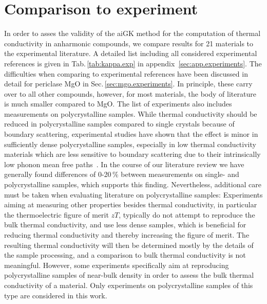 \section{Comparison to experiment}
\label{sec:results.experiments}
In order to asses the validity of the aiGK method for the computation of thermal conductivity in anharmonic compounds, we compare results for 21 materials to the experimental literature. A detailed list including all considered experimental references is given in Tab.\,\ref{tab:kappa.exp} in appendix~\ref{sec:app.experiments}. The difficulties when comparing to experimental references have been discussed in detail for periclase MgO in Sec.\,\ref{sec:mgo.experiments}. In principle, these carry over to all other compounds, however, for most materials, the body of literature is much smaller compared to MgO. The list of experiments also includes measurements on polycrystalline samples. While thermal conductivity should be reduced in polycrystalline samples compared to single crystals because of boundary scattering, experimental studies have shown that the effect is minor in sufficiently dense polycrystalline samples, especially in low thermal conductivity materials which are less sensitive to boundary scattering due to their intrinsically low phonon mean free paths~\cite{Charvat.1957}. In the course of our literature review we have generally found differences of 0-20\,\% between measurements on single- and polycrystalline samples, which supports this finding. Nevertheless, additional care must be taken when evaluating literature on polycrystalline samples: Experiments aiming at measuring other properties besides thermal conductivity, in particular the thermoelectric figure of merit $zT$, typically do not attempt to reproduce the bulk thermal conductivity, and use less dense samples, which is beneficial for reducing thermal conductivity and thereby increasing the figure of merit. The resulting thermal conductivity will then be determined mostly by the details of the sample processing, 
and a comparison to bulk thermal conductivity is not meaningful. However, some experiments specifically aim at reproducing polycrystalline samples of near-bulk density in order to assess the bulk thermal conductivity of a material. Only experiments on polycrystalline samples of this type are considered in this work.

